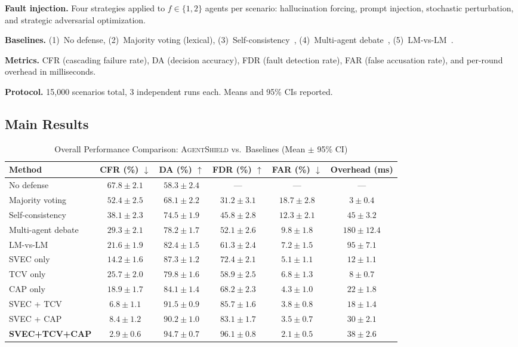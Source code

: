 \documentclass[journal,10pt]{IEEEtran}
\begin{document}
\textbf{Fault injection.} Four strategies applied to $f \in \{1, 2\}$ agents per scenario: hallucination forcing, prompt injection, stochastic perturbation, and strategic adversarial optimization.

\textbf{Baselines.} (1)~No defense, (2)~Majority voting (lexical), (3)~Self-consistency~\cite{wang2023selfconsistency}, (4)~Multi-agent debate~\cite{du2024debate}, (5)~LM-vs-LM~\cite{cohen2024lmvslm}.

\textbf{Metrics.} CFR (cascading failure rate), DA (decision accuracy), FDR (fault detection rate), FAR (false accusation rate), and per-round overhead in milliseconds.

\textbf{Protocol.} 15{,}000 scenarios total, 3 independent runs each. Means and 95\% CIs reported.

\subsection{Main Results}

\begin{table}[t]
\centering
\caption{Overall Performance Comparison: \textsc{AgentShield} vs.\ Baselines (Mean $\pm$ 95\% CI)}
\label{tab:main_results}
\renewcommand{\arraystretch}{1.15}
\begin{tabular}{@{}l c c c c c@{}}
\toprule
\textbf{Method} & \textbf{CFR (\%) $\downarrow$} & \textbf{DA (\%) $\uparrow$} & \textbf{FDR (\%) $\uparrow$} & \textbf{FAR (\%) $\downarrow$} & \textbf{Overhead (ms)} \\
\midrule
No defense & $67.8 \pm 2.1$ & $58.3 \pm 2.4$ & --- & --- & --- \\
Majority voting & $52.4 \pm 2.5$ & $68.1 \pm 2.2$ & $31.2 \pm 3.1$ & $18.7 \pm 2.8$ & $3 \pm 0.4$ \\
Self-consistency~\cite{wang2023selfconsistency} & $38.1 \pm 2.3$ & $74.5 \pm 1.9$ & $45.8 \pm 2.8$ & $12.3 \pm 2.1$ & $45 \pm 3.2$ \\
Multi-agent debate~\cite{du2024debate} & $29.3 \pm 2.1$ & $78.2 \pm 1.7$ & $52.1 \pm 2.6$ & $9.8 \pm 1.8$ & $180 \pm 12.4$ \\
LM-vs-LM~\cite{cohen2024lmvslm} & $21.6 \pm 1.9$ & $82.4 \pm 1.5$ & $61.3 \pm 2.4$ & $7.2 \pm 1.5$ & $95 \pm 7.1$ \\
\midrule
SVEC only & $14.2 \pm 1.6$ & $87.3 \pm 1.2$ & $72.4 \pm 2.1$ & $5.1 \pm 1.1$ & $12 \pm 1.1$ \\
TCV only & $25.7 \pm 2.0$ & $79.8 \pm 1.6$ & $58.9 \pm 2.5$ & $6.8 \pm 1.3$ & $8 \pm 0.7$ \\
CAP only & $18.9 \pm 1.7$ & $84.1 \pm 1.4$ & $68.2 \pm 2.3$ & $4.3 \pm 1.0$ & $22 \pm 1.8$ \\
SVEC + TCV & $6.8 \pm 1.1$ & $91.5 \pm 0.9$ & $85.7 \pm 1.6$ & $3.8 \pm 0.8$ & $18 \pm 1.4$ \\
SVEC + CAP & $8.4 \pm 1.2$ & $90.2 \pm 1.0$ & $83.1 \pm 1.7$ & $3.5 \pm 0.7$ & $30 \pm 2.1$ \\
\rowcolor{safegreen!8}
\textbf{SVEC+TCV+CAP} & $\mathbf{2.9 \pm 0.6}$ & $\mathbf{94.7 \pm 0.7}$ & $\mathbf{96.1 \pm 0.8}$ & $\mathbf{2.1 \pm 0.5}$ & $38 \pm 2.6$ \\
\bottomrule
\end{tabular}
\end{table}
\end{document}

